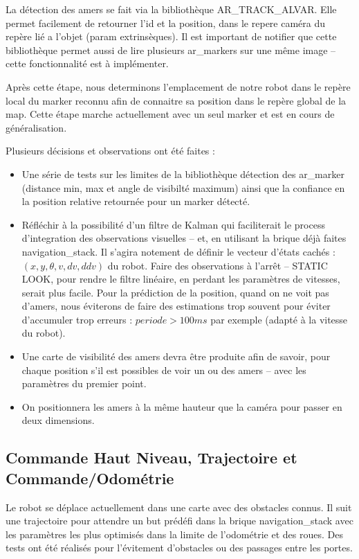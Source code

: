 \documentclass[a4wide,10pt]{article}
\begin{document}
La détection des amers se fait via la bibliothèque AR\_TRACK\_ALVAR.
Elle permet facilement de retourner l'id et la position, dans le repere caméra du repère lié a l'objet (param extrinsèques). 
Il est important de notifier que cette bibliothèque permet aussi de lire plusieurs ar\_markers sur une même image -- cette fonctionnalité est à implémenter. 

Après cette étape, nous determinons l'emplacement de notre robot dans le repère local du  marker reconnu afin de connaitre sa position dans le repère global de la map. Cette étape marche actuellement avec un seul marker et est en cours de généralisation. 

Plusieurs décisions et observations ont été faites :

\begin{itemize}
\item Une série de tests sur les limites de la bibliothèque détection des ar\_marker (distance min, max et angle de visibilté maximum) ainsi que la confiance en la position relative retournée pour un marker détecté.
\item Réfléchir à la possibilité d'un filtre de Kalman qui faciliterait le process d'integration des observations visuelles -- et, en utilisant la brique déjà faites navigation\_stack. 
Il s'agira notement de définir le vecteur d'états cachés : $(x, y, \theta, v, dv, ddv)$ du robot. 
Faire des observations à l'arrêt -- STATIC LOOK, pour rendre le filtre linéaire, en perdant les paramètres de vitesses, serait plus facile.
Pour la prédiction de la position, quand on ne voit pas d'amers, nous éviterons de faire des estimations trop souvent pour éviter d'accumuler trop erreurs : $periode > 100 ms$ par exemple (adapté à la vitesse du robot).  
\item Une carte de visibilité des amers devra être produite afin de savoir, pour chaque position s'il est possibles de voir un ou des amers -- avec les paramètres du premier point. 
\item On positionnera les amers à la même hauteur que la caméra pour passer en deux dimensions. 
\end{itemize}


\subsection*{Commande Haut Niveau, Trajectoire et Commande/Odométrie}

Le robot se déplace actuellement dans une carte avec des obstacles connus. Il suit une trajectoire pour attendre un but prédéfi dans la brique navigation\_stack avec les paramètres les plus optimisés dans la limite de l'odométrie et des roues. 
Des tests ont été réalisés pour l'évitement d'obstacles ou des passages entre les portes. 
\end{document}
